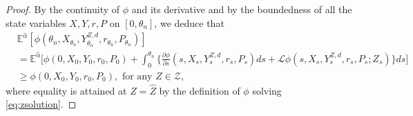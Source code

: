 \documentclass[12pt]{article}
\begin{document}
\begin{proof}


By the continuity of $\phi$ and its derivative and by the boundedness of all the state variables $X,Y,r,P$ on $[0,\theta_n]$, we deduce that 
\begin{align*}
&\mathbb{E}^{\hat\alpha} [\phi(\theta_n,X_{\theta_n},Y^{Z,d}_{\theta_n}, r_{\theta_n},P_{\theta_n})]\\
&= \mathbb{E}^{\hat\alpha} \Big[\phi(0,X_0,Y_0,r_0,P_0) + \int_0^{\theta_n}  \Bigr\{ \frac{\partial \phi}{\partial s} (s, X_s, Y^{Z,d}_s,r_s,P_s) ds  +\mathcal L\phi (s, X_s, Y^{Z,d}_s, r_s, P_s; Z_s) \Bigr\} ds \Big] \\
&\geq \phi(0,X_0,Y_0,r_0,P_0), \text{ for any } Z\in \mathcal Z,\end{align*} where equality is attained at $Z=\hat Z$ by the definition of $\phi$ solving \eqref{eq:zsolution}.


\end{proof}
\end{document}
